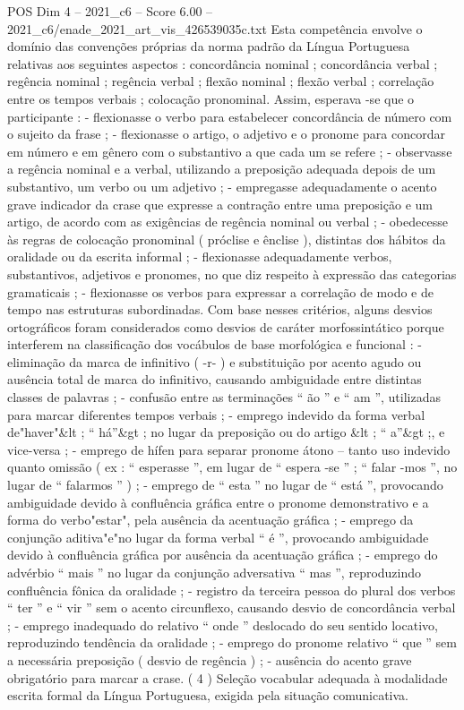 \begin{textsample}{POS Dim 4 – 2021\_c6 – Score 6.00 – 2021\_c6/enade\_2021\_art\_vis\_426539035c.txt}
Esta competência envolve o domínio das convenções próprias da norma padrão da Língua Portuguesa relativas aos seguintes aspectos : concordância nominal ; concordância verbal ; regência nominal ; regência verbal ; flexão nominal ; flexão verbal ; correlação entre os tempos verbais ; colocação pronominal.
Assim, esperava -se que o participante : - flexionasse o verbo para estabelecer concordância de número com o sujeito da frase ; - flexionasse o artigo, o adjetivo e o pronome para concordar em número e em gênero com o substantivo a que cada um se refere ; - observasse a regência nominal e a verbal, utilizando a preposição adequada depois de um substantivo, um verbo ou um adjetivo ; - empregasse adequadamente o acento grave indicador da crase que expresse a contração entre uma preposição e um artigo, de acordo com as exigências de regência nominal ou verbal ; - obedecesse às regras de colocação pronominal ( próclise e ênclise ), distintas dos hábitos da oralidade ou da escrita informal ; - flexionasse adequadamente verbos, substantivos, adjetivos e pronomes, no que diz respeito à expressão das categorias gramaticais ; - flexionasse os verbos para expressar a correlação de modo e de tempo nas estruturas subordinadas.
Com base nesses critérios, alguns desvios ortográficos foram considerados como desvios de caráter morfossintático porque interferem na classificação dos vocábulos de base morfológica e funcional : - eliminação da marca de infinitivo ( -r- ) e substituição por acento agudo ou ausência total de marca do infinitivo, causando ambiguidade entre distintas classes de palavras ; - confusão entre as terminações “ ão ” e “ am ”, utilizadas para marcar diferentes tempos verbais ; - emprego indevido da forma verbal de"haver"\&lt ; “ há”\&gt ; no lugar da preposição ou do artigo \&lt ; “ a”\&gt ;, e vice-versa ; - emprego de hífen para separar pronome átono – tanto uso indevido quanto omissão ( ex : “ esperasse ”, em lugar de “ espera -se ” ; “ falar -mos ”, no lugar de “ falarmos ” ) ; - emprego de “ esta ” no lugar de “ está ”, provocando ambiguidade devido à confluência gráfica entre o pronome demonstrativo e a forma do verbo"estar", pela ausência da acentuação gráfica ; - emprego da conjunção aditiva"e"no lugar da forma verbal “ é ”, provocando ambiguidade devido à confluência gráfica por ausência da acentuação gráfica ; - emprego do advérbio “ mais ” no lugar da conjunção adversativa “ mas ”, reproduzindo confluência fônica da oralidade ; - registro da terceira pessoa do plural dos verbos “ ter ” e “ vir ” sem o acento circunflexo, causando desvio de concordância verbal ; - emprego inadequado do relativo “ onde ” deslocado do seu sentido locativo, reproduzindo tendência da oralidade ; - emprego do pronome relativo “ que ” sem a necessária preposição ( desvio de regência ) ; - ausência do acento grave obrigatório para marcar a crase. ( 4 ) Seleção vocabular adequada à modalidade escrita formal da Língua Portuguesa, exigida pela situação comunicativa.

\end{textsample}
